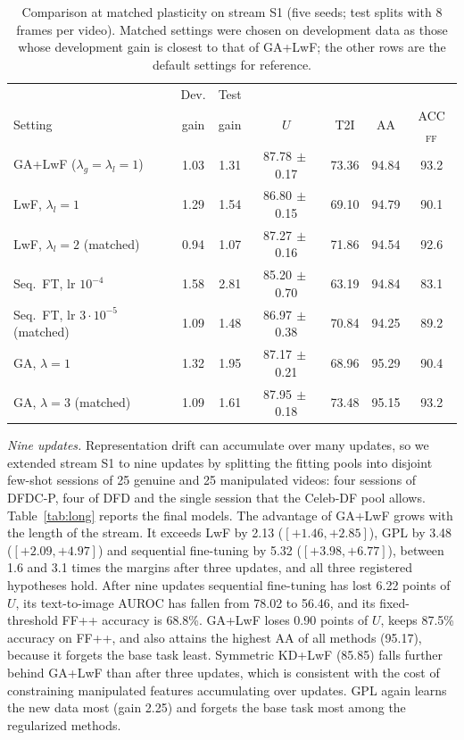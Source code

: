 \documentclass{ieeeaccess}
\newcommand{\ffpp}{FF{+}{+}}
\begin{document}
\begin{table}[t]
\caption{Comparison at matched plasticity on stream S1 (five seeds; test splits with 8 frames per video). Matched settings were chosen on development data as those whose development gain is closest to that of GA+LwF; the other rows are the default settings for reference.}
\label{tab:matched}
\centering
\footnotesize
\setlength{\tabcolsep}{1.7pt}
\begin{tabular}{@{}lcccccc@{}}
\toprule
& Dev. & Test & & & & \\
Setting & gain & gain & $U$ & T2I & AA & ACC$_{\mathrm{FF}}$ \\
\midrule
GA+LwF ($\lambda_g=\lambda_l=1$) & 1.03 & 1.31 & 87.78{\tiny$\,\pm$0.17} & 73.36 & 94.84 & 93.2 \\
LwF, $\lambda_l=1$ & 1.29 & 1.54 & 86.80{\tiny$\,\pm$0.15} & 69.10 & 94.79 & 90.1 \\
LwF, $\lambda_l=2$ (matched) & 0.94 & 1.07 & 87.27{\tiny$\,\pm$0.16} & 71.86 & 94.54 & 92.6 \\
Seq.\ FT, lr $10^{-4}$ & 1.58 & 2.81 & 85.20{\tiny$\,\pm$0.70} & 63.19 & 94.84 & 83.1 \\
Seq.\ FT, lr $3{\cdot}10^{-5}$ (matched) & 1.09 & 1.48 & 86.97{\tiny$\,\pm$0.38} & 70.84 & 94.25 & 89.2 \\
GA, $\lambda=1$ & 1.32 & 1.95 & 87.17{\tiny$\,\pm$0.21} & 68.96 & 95.29 & 90.4 \\
GA, $\lambda=3$ (matched) & 1.09 & 1.61 & 87.95{\tiny$\,\pm$0.18} & 73.48 & 95.15 & 93.2 \\
\bottomrule
\end{tabular}
\end{table}

\textit{Nine updates.}\label{sec:long} Representation drift can accumulate over many updates, so we extended stream S1 to nine updates by splitting the fitting pools into disjoint few-shot sessions of 25 genuine and 25 manipulated videos: four sessions of DFDC-P, four of DFD and the single session that the Celeb-DF pool allows. Table~\ref{tab:long} reports the final models. The advantage of GA+LwF grows with the length of the stream. It exceeds LwF by 2.13 ($[+1.46,+2.85]$), GPL by 3.48 ($[+2.09,+4.97]$) and sequential fine-tuning by 5.32 ($[+3.98,+6.77]$), between 1.6 and 3.1 times the margins after three updates, and all three registered hypotheses hold. After nine updates sequential fine-tuning has lost 6.22 points of $U$, its text-to-image AUROC has fallen from 78.02 to 56.46, and its fixed-threshold \ffpp{} accuracy is 68.8\%. GA+LwF loses 0.90 points of $U$, keeps 87.5\% accuracy on \ffpp{}, and also attains the highest AA of all methods (95.17), because it forgets the base task least. Symmetric KD+LwF (85.85) falls further behind GA+LwF than after three updates, which is consistent with the cost of constraining manipulated features accumulating over updates. GPL again learns the new data most (gain 2.25) and forgets the base task most among the regularized methods.
\end{document}
